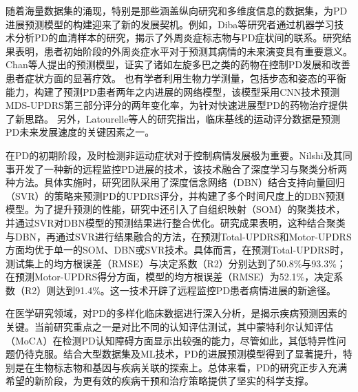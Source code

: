 随着海量数据集的涌现，特别是那些涵盖纵向研究和多维度信息的数据集\cite{latourelle2017large,simuni2016predictors,holford2006disease}，为PD进展预测模型的构建迎来了新的发展契机。例如，Diba等研究者\cite{ahmadi2019parkinson}通过机器学习技术分析PD的血清样本的研究，揭示了外周炎症标志物与PD症状间的联系。研究结果表明，患者初始阶段的外周炎症水平对于预测其病情的未来演变具有重要意义。Chan等人\cite{chan2007levodopa}提出的预测模型，证实了诸如左旋多巴之类的药物在控制PD发展和改善患者症状方面的显著疗效。
也有学者利用生物力学测量，包括步态和姿态的平衡能力，构建了预测PD患者两年之内进展的网络模型\cite{raval2020prediction}，该模型采用CNN技术预测MDS-UPDRS第三部分评分的两年变化率，为针对快速进展型PD的药物治疗提供了新思路。
另外，Latourelle等人\cite{latourelle2017large}的研究指出，临床基线的运动评分数据是预测PD未来发展速度的关键因素之一。

在PD的初期阶段，及时检测非运动症状对于控制病情发展极为重要。Nilshi及其同事\cite{nilashi2020remote}开发了一种新的远程监控PD进展的技术，该技术融合了深度学习与聚类分析两种方法。具体实施时，研究团队采用了深度信念网络（DBN）结合支持向量回归（SVR）的策略来预测PD的UPDRS评分，并构建了多个时间尺度上的DBN预测模型。为了提升预测的性能，研究中还引入了自组织映射（SOM）的聚类技术，并通过SVR对DBN模型的预测结果进行整合优化。研究成果表明，这种结合聚类与DBN，再通过SVR进行结果融合的方法，在预测Total-UPDRS和Motor-UPDRS方面均优于单一的SOM、DBN或SVR技术。具体而言，在预测Total-UPDRS时，测试集上的均方根误差（RMSE）与决定系数（R2）分别达到了50.8\%与93.3\%；在预测Motor-UPDRS得分方面，模型的均方根误差（RMSE）为52.1\%，决定系数（R2）则达到91.4\%。这一技术开辟了远程监控PD患者病情进展的新途径。

在医学研究领域，对PD的多样化临床数据进行深入分析，是揭示疾病预测因素的关键。当前研究重点之一是对比不同的认知评估测试，其中蒙特利尔认知评估（MoCA）在检测PD认知障碍方面显示出较强的能力，尽管如此，其低特异性问题仍待克服。结合大型数据集及ML技术，PD的进展预测模型得到了显著提升，特别是在生物标志物和基因与疾病关联的探索上。总体来看，PD的研究正步入充满希望的新阶段，为更有效的疾病干预和治疗策略提供了坚实的科学支撑。

    
